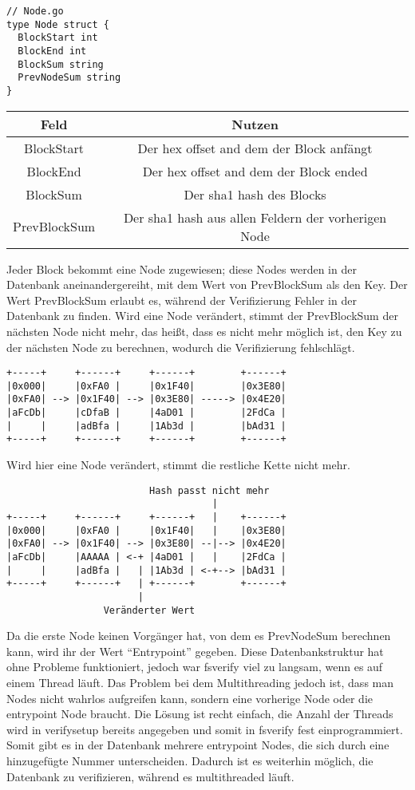 \begin{verbatim}
// Node.go
type Node struct {
  BlockStart int
  BlockEnd int
  BlockSum string
  PrevNodeSum string
}
\end{verbatim}

\begin{center}
  \begin{tabular}{|c | c|}
    \hline
    Feld & Nutzen \\ [0.5ex]
    \hline
    BlockStart & Der hex offset and dem der Block anfängt \\
    \hline
    BlockEnd & Der hex offset and dem der Block ended \\
    \hline
    BlockSum & Der sha1 hash des Blocks \\
    \hline
    PrevBlockSum & Der sha1 hash aus allen Feldern der vorherigen Node \\
    \hline
  \end{tabular}
\end{center}
Jeder Block bekommt eine Node zugewiesen; diese Nodes werden in der Datenbank aneinandergereiht, mit dem Wert von PrevBlockSum als den Key.
Der Wert PrevBlockSum erlaubt es, während der Verifizierung Fehler in der Datenbank zu finden. Wird eine Node verändert, stimmt der PrevBlockSum der nächsten Node nicht mehr, das heißt, dass es nicht mehr möglich ist, den Key zu der nächsten Node zu berechnen, wodurch die Verifizierung fehlschlägt.
\pagebreak
\begin{verbatim}
+-----+     +------+     +------+        +------+
|0x000|     |0xFA0 |     |0x1F40|        |0x3E80|
|0xFA0| --> |0x1F40| --> |0x3E80| -----> |0x4E20|
|aFcDb|     |cDfaB |     |4aD01 |        |2FdCa |
|     |     |adBfa |     |1Ab3d |        |bAd31 |
+-----+     +------+     +------+        +------+
\end{verbatim}
Wird hier eine Node verändert, stimmt die restliche Kette nicht mehr.
\begin{verbatim}
                         Hash passt nicht mehr
                                    |
+-----+     +------+     +------+   |    +------+
|0x000|     |0xFA0 |     |0x1F40|   |    |0x3E80|
|0xFA0| --> |0x1F40| --> |0x3E80| --|--> |0x4E20|
|aFcDb|     |AAAAA | <-+ |4aD01 |   |    |2FdCa |
|     |     |adBfa |   | |1Ab3d | <-+--> |bAd31 |
+-----+     +------+   | +------+        +------+
                       |
                 Veränderter Wert
\end{verbatim}
Da die erste Node keinen Vorgänger hat, von dem es PrevNodeSum berechnen kann, wird ihr der Wert ``Entrypoint'' gegeben.
\bigbreak \noindent
Diese Datenbankstruktur hat ohne Probleme funktioniert, jedoch war fsverify viel zu langsam, wenn es auf einem Thread läuft. Das Problem bei dem Multithreading jedoch ist, dass man Nodes nicht wahrlos aufgreifen kann, sondern eine vorherige Node oder die entrypoint Node braucht. Die Lösung ist recht einfach, die Anzahl der Threads wird in verifysetup bereits angegeben und somit in fsverify fest einprogrammiert. Somit gibt es in der Datenbank mehrere entrypoint Nodes, die sich durch eine hinzugefügte Nummer unterscheiden. Dadurch ist es weiterhin möglich, die Datenbank zu verifizieren, während es multithreaded läuft.

